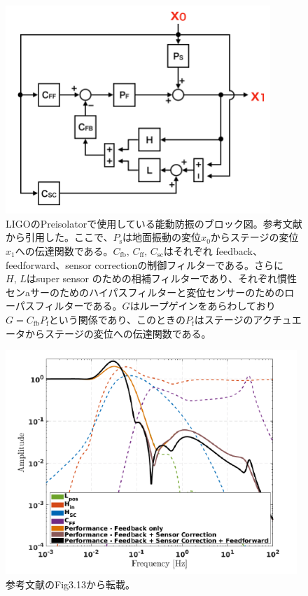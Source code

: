 \documentclass[a4paper,12pt]{jsarticle}
\begin{document}
\begin{figure}[H]
  \begin{center}
    \includegraphics[width=10.0cm]{./img_2dof_pi.png}
  \end{center}
  \caption{LIGOのPreisolatorで使用している能動防振のブロック図。参考文献\cite{matichard2015seismic}から引用した。ここで、$P_{\mathrm{s}}$は地面振動の変位$x_0$からステージの変位$x_1$への伝達関数である。$C_{\mathrm{fb}},\,C_{\mathrm{ff}},\,C_{\mathrm{sc}}$はそれぞれ feedback、feedforward、sensor correctionの制御フィルターである。さらに$H,\,L$はsuper sensor のための相補フィルターであり、それぞれ慣性センaサーのためのハイパスフィルターと変位センサーのためのローパスフィルターである。$G$はループゲインをあらわしており$G=C_{\mathrm{fb}}P_{\mathrm{f}}$という関係であり、このときの$P_{\mathrm{f}}$はステージのアクチュエータからステージの変位への伝達関数である。}\label{img:img_2dof_pi}
\end{figure}

\begin{figure}[H]
  \begin{center}
    \includegraphics[width=11.0cm]{./img_pi_fb_sc_ff.png}
  \end{center}
  \caption{参考文献\cite{biscansD2018}のFig3.13から転載。}
  \label{img:img_pi_fb_sc_ff}
\end{figure}
\end{document}
